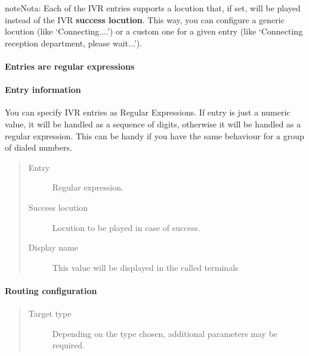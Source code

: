 \documentclass[letterpaper,10pt,spanish]{sphinxmanual}
\begin{document}
\begin{notice}{note}{Nota:}
Each of the IVR entries supports a locution that, if set,
will be played instead of the IVR \textbf{success locution}. This way, you can
configure a generic locution (like `Connecting....') or a custom one for
a given entry (like `Connecting reception department, please wait...').
\end{notice}
\paragraph{Entries are regular expressions}


\paragraph{Entry information}
\label{administration_portal/client/vpbx/routing_endpoints/ivrs:entry-information}
You can specify IVR entries as Regular Expressions. If entry is just
a numeric value, it will be handled as a sequence of digits, otherwise it
will be handled as a regular expression. This can be handy if you have the
same behaviour for a group of dialed numbers.
\begin{quote}
\begin{description}
\item[{Entry}] \leavevmode
Regular expression.

\item[{Success locution}] \leavevmode
Locution to be played in case of success.

\item[{Display name}] \leavevmode
This value will be displayed in the called terminals

\end{description}
\end{quote}


\paragraph{Routing configuration}
\label{administration_portal/client/vpbx/routing_endpoints/ivrs:routing-configuration}\begin{quote}
\begin{description}
\item[{Target type}] \leavevmode
Depending on the type chosen, additional parameters may be required.

\end{description}
\end{quote}
\end{document}
